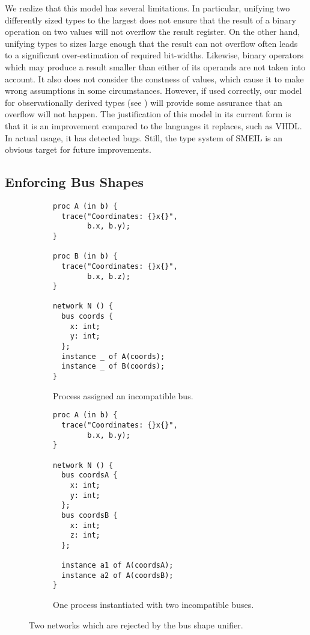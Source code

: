 
We realize that this model has several limitations. In particular, unifying two
differently sized types to the largest does not ensure that the result of a
binary operation on two values will not overflow the result register. On the
other hand, unifying types to sizes large enough that the result can not
overflow often leads to a significant over-estimation of required
bit-widths. Likewise, binary operators which may produce a result smaller than
either of its operands are not taken into account. It also does not consider the
constness of values, which cause it to make wrong assumptions in some
circumstances. However, if used correctly, our model for observationally derived
types (see ) will provide some assurance that an overflow will
not happen. The justification of this model in its current form is that it is
an improvement compared to the languages it replaces, such as VHDL. In actual
usage, it has detected bugs. Still, the type system of SMEIL is an obvious
target for future improvements.

\subsection{Enforcing Bus Shapes}
\begin{figure}
  \begin{subfigure}[t]{0.49\textwidth}
\begin{lstlisting}[language=smeil]
proc A (in b) {
  trace("Coordinates: {}x{}",
        b.x, b.y);
}

proc B (in b) {
  trace("Coordinates: {}x{}",
        b.x, b.z);
}

network N () {
  bus coords {
    x: int;
    y: int;
  };
  instance _ of A(coords);
  instance _ of B(coords);
}
\end{lstlisting}
    \caption{Process assigned an incompatible bus.}
    \label{fig:incom1}
   
  \end{subfigure}
\begin{subfigure}[t]{0.49\textwidth}  
\begin{lstlisting}[language=smeil]
proc A (in b) {
  trace("Coordinates: {}x{}",
        b.x, b.y);
}

network N () {
  bus coordsA {
    x: int;
    y: int;
  };
  bus coordsB {
    x: int;
    z: int;
  };

  instance a1 of A(coordsA);
  instance a2 of A(coordsB);
}
\end{lstlisting}
    \caption{One process instantiated with two incompatible buses.}
    \label{fig:incom2}
  \end{subfigure}
  \caption{Two networks which are rejected by the bus shape unifier.}
  \label{fig:busuni}
\end{figure}


